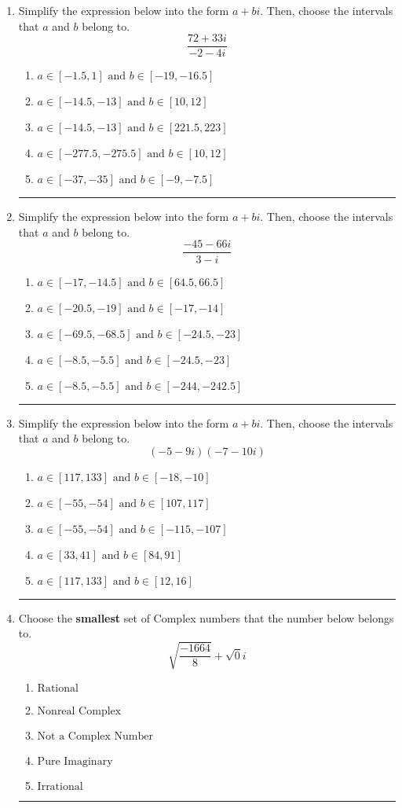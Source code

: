\documentclass[14pt]{extbook}
\newcommand{\litem}[1]{\item#1\hspace*{-1cm}\rule{\textwidth}{0.4pt}}
\begin{document}
\begin{enumerate}
{\begin{enumerate}[label=\Alph*.]
\end{enumerate} }
\litem{
Simplify the expression below into the form $a+bi$. Then, choose the intervals that $a$ and $b$ belong to.\[ \frac{72 + 33 i}{-2 - 4 i} \]\begin{enumerate}[label=\Alph*.]
\item \( a \in [-1.5, 1] \text{ and } b \in [-19, -16.5] \)
\item \( a \in [-14.5, -13] \text{ and } b \in [10, 12] \)
\item \( a \in [-14.5, -13] \text{ and } b \in [221.5, 223] \)
\item \( a \in [-277.5, -275.5] \text{ and } b \in [10, 12] \)
\item \( a \in [-37, -35] \text{ and } b \in [-9, -7.5] \)

\end{enumerate} }
\litem{
Simplify the expression below into the form $a+bi$. Then, choose the intervals that $a$ and $b$ belong to.\[ \frac{-45 - 66 i}{3 - i} \]\begin{enumerate}[label=\Alph*.]
\item \( a \in [-17, -14.5] \text{ and } b \in [64.5, 66.5] \)
\item \( a \in [-20.5, -19] \text{ and } b \in [-17, -14] \)
\item \( a \in [-69.5, -68.5] \text{ and } b \in [-24.5, -23] \)
\item \( a \in [-8.5, -5.5] \text{ and } b \in [-24.5, -23] \)
\item \( a \in [-8.5, -5.5] \text{ and } b \in [-244, -242.5] \)

\end{enumerate} }
\litem{
Simplify the expression below into the form $a+bi$. Then, choose the intervals that $a$ and $b$ belong to.\[ (-5 - 9 i)(-7 - 10 i) \]\begin{enumerate}[label=\Alph*.]
\item \( a \in [117, 133] \text{ and } b \in [-18, -10] \)
\item \( a \in [-55, -54] \text{ and } b \in [107, 117] \)
\item \( a \in [-55, -54] \text{ and } b \in [-115, -107] \)
\item \( a \in [33, 41] \text{ and } b \in [84, 91] \)
\item \( a \in [117, 133] \text{ and } b \in [12, 16] \)

\end{enumerate} }
\litem{
Choose the \textbf{smallest} set of Complex numbers that the number below belongs to.\[ \sqrt{\frac{-1664}{8}}+\sqrt{0}i \]\begin{enumerate}[label=\Alph*.]
\item \( \text{Rational} \)
\item \( \text{Nonreal Complex} \)
\item \( \text{Not a Complex Number} \)
\item \( \text{Pure Imaginary} \)
\item \( \text{Irrational} \)


\end{enumerate}}
\end{enumerate}
\end{document}
